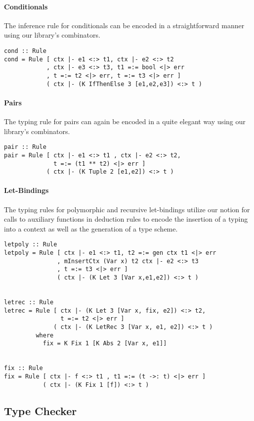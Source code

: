 \paragraph{Conditionals} The inference rule for conditionals can be
encoded in a straightforward manner using our library's combinators.
\begin{lstlisting}
cond :: Rule
cond = Rule [ ctx |- e1 <:> t1, ctx |- e2 <:> t2
            , ctx |- e3 <:> t3, t1 =:= bool <|> err
            , t =:= t2 <|> err, t =:= t3 <|> err ]
            ( ctx |- (K IfThenElse 3 [e1,e2,e3]) <:> t )
\end{lstlisting}

\paragraph{Pairs} The typing rule for pairs can again be encoded in a
quite elegant way using our library's combinators.

\begin{lstlisting}
pair :: Rule
pair = Rule [ ctx |- e1 <:> t1 , ctx |- e2 <:> t2,
              t =:= (t1 ** t2) <|> err ]
            ( ctx |- (K Tuple 2 [e1,e2]) <:> t )
\end{lstlisting}

\paragraph{Let-Bindings} The typing rules for polymorphic and
recursive let-bindings utilize our notion for calls to auxiliary
functions in deduction rules to encode the insertion of a typing into
a context as well as the generation of a type scheme.
\begin{lstlisting}
letpoly :: Rule
letpoly = Rule [ ctx |- e1 <:> t1, t2 =:= gen ctx t1 <|> err
               , mInsertCtx (Var x) t2 ctx |- e2 <:> t3
               , t =:= t3 <|> err ]
               ( ctx |- (K Let 3 [Var x,e1,e2]) <:> t )


letrec :: Rule
letrec = Rule [ ctx |- (K Let 3 [Var x, fix, e2]) <:> t2,
                t =:= t2 <|> err ]
              ( ctx |- (K LetRec 3 [Var x, e1, e2]) <:> t )
         where
           fix = K Fix 1 [K Abs 2 [Var x, e1]]


fix :: Rule
fix = Rule [ ctx |- f <:> t1 , t1 =:= (t ->: t) <|> err ]
           ( ctx |- (K Fix 1 [f]) <:> t )
\end{lstlisting}

\subsection{Type Checker}


